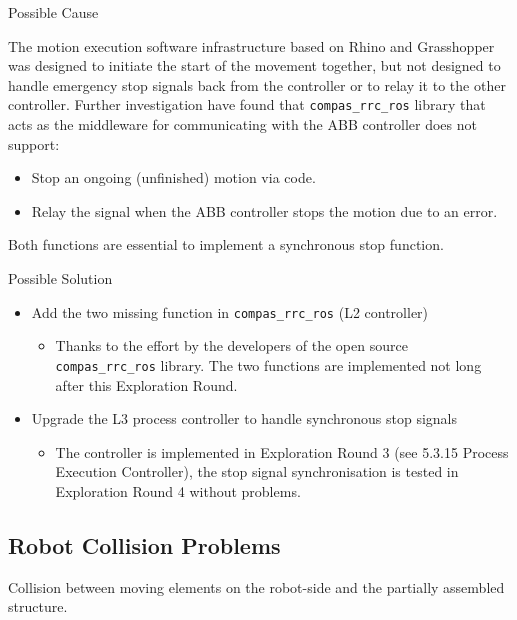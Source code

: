 Possible Cause

The motion execution software infrastructure based on Rhino and Grasshopper was designed to initiate the start of the movement together, but not designed to handle emergency stop signals back from the controller or to relay it to the other controller.
Further investigation have found that \verb|compas_rrc_ros| library that acts as the middleware for communicating with the ABB controller does not support:
\begin{itemize}
    \item Stop an ongoing (unfinished) motion via code.
    \item Relay the signal when the ABB controller stops the motion due to an error. 
\end{itemize}

Both functions are essential to implement a synchronous stop function.

Possible Solution

\begin{itemize}
    \item Add the two missing function in \verb|compas_rrc_ros| (L2 controller)
    \begin{itemize}
        \item Thanks to the effort by the developers of the open source \verb|compas_rrc_ros| library. The two functions are implemented not long after this Exploration Round. 
    \end{itemize}
    \item Upgrade the L3 process controller to handle synchronous stop signals
    \begin{itemize}
        \item The controller is implemented in Exploration Round 3 (see 5.3.15 Process Execution Controller), the stop signal synchronisation is tested in Exploration Round 4 without problems.
    \end{itemize}
\end{itemize}

\subsection{Robot Collision Problems}
\label{subsection:exploration_2_robot_collision_problems}

Collision between moving elements on the robot-side and the partially assembled structure.

